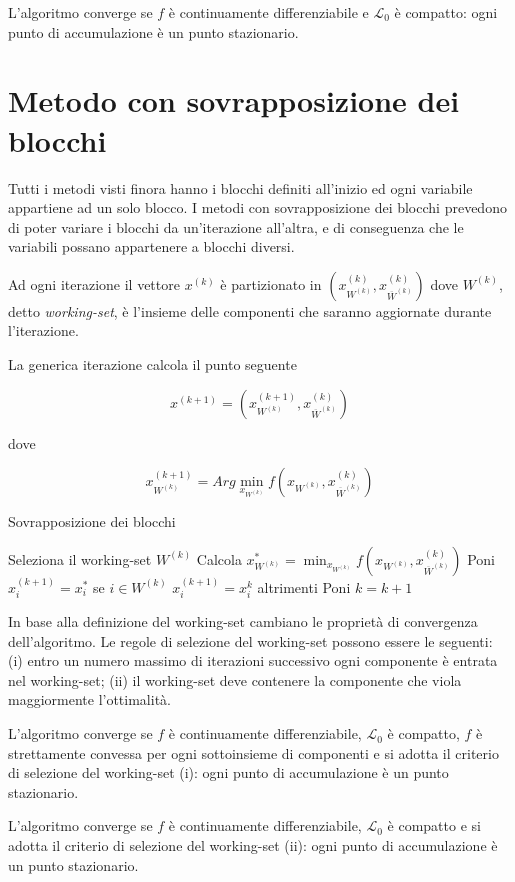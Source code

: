 L'algoritmo converge se $f$ è continuamente differenziabile e $\mathcal{L}_{0}$ è compatto: ogni punto di accumulazione è un punto stazionario.


\section{Metodo con sovrapposizione dei blocchi}
\label{sec:methods.decomposition.overlap-blocks}
Tutti i metodi visti finora hanno i blocchi definiti all'inizio ed ogni variabile appartiene ad un solo blocco.
I metodi con sovrapposizione dei blocchi prevedono di poter variare i blocchi da un'iterazione all'altra, e di conseguenza che le variabili possano appartenere a blocchi diversi.

Ad ogni iterazione il vettore $x^{(k)}$ è partizionato in $(x_{W^{(k)}}^{(k)},x_{\overline{W}^{(k)}}^{(k)})$ dove $W^{(k)}$, detto \textit{working-set}, è l'insieme delle componenti che saranno aggiornate durante l'iterazione.

La generica iterazione calcola il punto seguente

\begin{equation}
  x^{(k+1)}=(x_{W^{(k)}}^{(k+1)},x_{\overline{W}^{(k)}}^{(k)})
\end{equation}

dove

\begin{equation}
  x_{W^{(k)}}^{(k+1)}=Arg\min_{x_{W^{(k)}}}f(x_{W^{(k)}},x_{\overline{W}^{(k)}}^{(k)})
\end{equation}

\begin{algorithm}
  \label{alg:methods.decomposition.overlap-blocks}
  \caption{Sovrapposizione dei blocchi}

   {
    Seleziona il working-set $W^{(k)}$
    Calcola $x_{W^{(k)}}^{*}=\min_{x_{W^{(k)}}} f(x_{W^{(k)}},x_{\overline{W}^{(k)}}^{(k)})$
    Poni
    $x_{i}^{(k+1)}=x_{i}^{*}$ se $i\in W^{(k)}$
    $x_{i}^{(k+1)}=x_{i}^{k}$ altrimenti
    Poni $k=k+1$
  }
\end{algorithm}

In base alla definizione del working-set cambiano le proprietà di convergenza dell'algoritmo. Le regole di selezione del working-set possono essere le seguenti:
(i) entro un numero massimo di iterazioni successivo ogni componente è entrata nel working-set;
(ii) il working-set deve contenere la componente che viola maggiormente l'ottimalità.

L'algoritmo converge se $f$ è continuamente differenziabile, $\mathcal{L}_{0}$ è compatto, $f$ è strettamente convessa per ogni sottoinsieme di componenti e si adotta il criterio di selezione del working-set (i): ogni punto di accumulazione è un punto stazionario.

L'algoritmo converge se $f$ è continuamente differenziabile, $\mathcal{L}_{0}$ è compatto e si adotta il criterio di selezione del working-set (ii): ogni punto di accumulazione è un punto stazionario.
